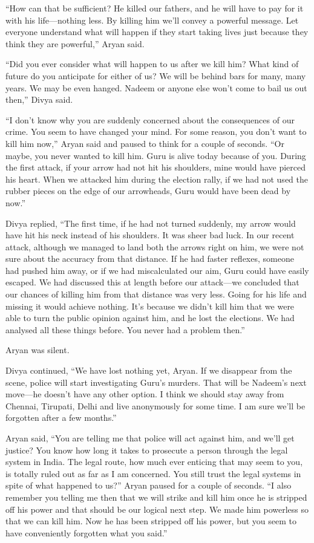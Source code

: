 “How can that be sufficient? He killed our fathers, and he will have to pay for
it with his life—nothing less. By killing him we'll convey a powerful message.
Let everyone understand what will happen if they start taking lives just because
they think they are powerful,” Aryan said.

“Did you ever consider what will happen to us after we kill him? What kind of
future do you anticipate for either of us? We will be behind bars for many, many
years. We may be even hanged. Nadeem or anyone else won't come to bail us out
then,” Divya said.

“I don't know why you are suddenly concerned about the consequences of our
crime. You seem to have changed your mind. For some reason, you don't want to
kill him now,” Aryan said and paused to think for a couple of seconds. “Or
maybe, you never wanted to kill him. Guru is alive today because of you. During
the first attack, if your arrow had not hit his shoulders, mine would have
pierced his heart. When we attacked him during the election rally, if we had not
used the rubber pieces on the edge of our arrowheads, Guru would have been dead
by now.”

Divya replied, “The first time, if he had not turned suddenly, my arrow would
have hit his neck instead of his shoulders. It was sheer bad luck. In our recent
attack, although we managed to land both the arrows right on him, we were not
sure about the accuracy from that distance. If he had faster reflexes, someone
had pushed him away, or if we had miscalculated our aim, Guru could have easily
escaped. We had discussed this at length before our attack—we concluded
that our chances of killing him from that distance was very less. Going for his
life and missing it would achieve nothing. It's because we didn't kill him that
we were able to turn the public opinion against him, and he lost the elections.
We had analysed all these things before. You never had a problem then.”

Aryan was silent.

Divya continued, “We have lost nothing yet, Aryan. If we disappear from the
scene, police will start investigating Guru's murders. That will be Nadeem's
next move—he doesn't have any other option. I think we should stay away from
Chennai, Tirupati, Delhi and live anonymously for some time. I am sure we'll be
forgotten after a few months.”

Aryan said, “You are telling me that police will act against him, and we'll get
justice? You know how long it takes to prosecute a person through the legal
system in India. The legal route, how much ever enticing that may seem to you,
is totally ruled out as far as I am concerned. You still trust the legal systems
in spite of what happened to us?” Aryan paused for a couple of seconds. “I also
remember you telling me then that we will strike and kill him once he is
stripped off his power and that should be our logical next step. We made him
powerless so that we can kill him. Now he has been stripped off his power, but
you seem to have conveniently forgotten what you said.”

